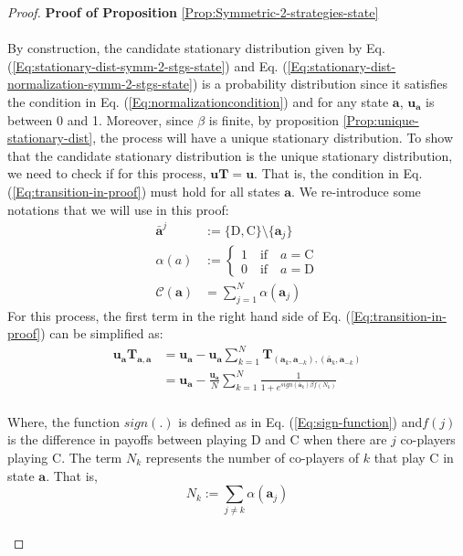 \documentclass[11pt]{article}
\theoremstyle{plainCl1}
\theoremstyle{plainCl2}
\newcommand{\abf}{\mathbf{a}}
\newcommand{\T}{\mathbf{T}}
\newcommand{\ubf}{\mathbf{u}}
\newcommand{\C}{\mathrm{C}}
\newcommand{\D}{\mathrm{D}}
\begin{document}
\begin{proof}
\textbf{Proof of Proposition} \ref{Prop:Symmetric-2-strategies-state} \\ \\
By construction, the candidate stationary distribution given by Eq. (\ref{Eq:stationary-dist-symm-2-stgs-state}) and Eq. (\ref{Eq:stationary-dist-normalization-symm-2-stgs-state}) is a probability distribution since it satisfies the condition in Eq. (\ref{Eq:normalizationcondition}) and for any state $\abf$, $\ubf_{\abf}$ is between 0 and 1.  Moreover, since $\beta$ is finite, by proposition \ref{Prop:unique-stationary-dist}, the process will have a unique stationary distribution. To show that the candidate stationary distribution is the unique stationary distribution, we need to check if for this process, $\ubf \T= \ubf$. That is, the condition in Eq. (\ref{Eq:transition-in-proof}) must hold for all states $\abf$. We re-introduce some notations that we will use in this proof: 
\begin{align}
\bar{\abf}^j &:= \{\D,\C\} \setminus \{\abf_j\} \\[10pt]
\alpha(a)&:= 
\begin{cases}
1 \quad \text{if} \quad a = \C \\[10pt]
0 \quad \text{if} \quad a = \D 
\end{cases}\\[10pt]
\mathcal{C}(\abf) &= \sum_{j=1}^N \alpha(\abf_j)
\end{align}
For this process, the first term in the right hand side of Eq. (\ref{Eq:transition-in-proof}) can be simplified as: 
\begin{align}
\ubf_{\abf} \T_{\abf,\abf}  &= \ubf_\abf - \ubf_{\abf} \sum_{k=1}^{N} \T_{(\abf_k, \abf_{-k}),(\bar{\abf}_{k}, \abf_{-k})} \\[10pt]
&= \ubf_{\abf} - \frac{\ubf_{\abf}}{N} \sum_{k=1}^N \frac{1}{1 + \displaystyle e^{\mathit{sign}(\bar{\abf}_{k}) \beta f(N_k)}}
\label{Eq:T_aa_u_a term}
\end{align}
\\ \noindent Where, the function $\mathit{sign}(.)$ is  defined as in Eq. (\ref{Eq:sign-function}) and$f(j)$ is the difference in payoffs between playing $\D$ and $\C$ when there are $j$ co-players playing $\C$. The term $N_k$ represents the number of co-players of $k$ that play $\C$ in state $\abf$. That is,
\begin{equation}
N_k := \sum_{j \neq k} \alpha(\abf_j)
\end{equation} \\

\end{proof}
\end{document}
